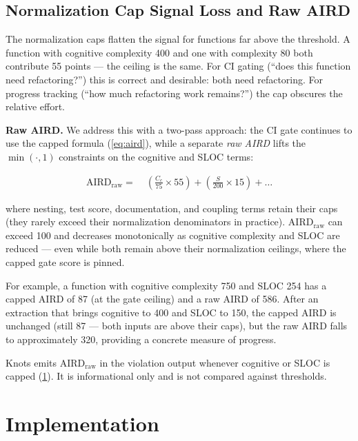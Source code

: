 \documentclass[10pt,twocolumn,letterpaper]{article}
\begin{document}
\subsection{Normalization Cap Signal Loss and Raw AIRD}
\label{sec:signal-loss}

The normalization caps flatten the signal for functions far above the
threshold.  A function with cognitive complexity 400 and one with
complexity 80 both contribute 55 points --- the ceiling is the same.
For CI gating (``does this function need refactoring?'') this is correct
and desirable: both need refactoring.  For progress tracking (``how much
refactoring work remains?'') the cap obscures the relative effort.

\textbf{Raw AIRD.}  We address this with a two-pass approach: the CI
gate continues to use the capped formula (\cref{eq:aird}), while a
separate \emph{raw AIRD} lifts the \(\min(\cdot, 1)\) constraints on the
cognitive and SLOC terms:

\begin{align}
\text{AIRD}_{\text{raw}} = &\;\left(\frac{C_c}{75} \times 55\right)
                           + \left(\frac{S}{200} \times 15\right)
                           + \ldots
\label{eq:aird-raw}
\end{align}

where nesting, test score, documentation, and coupling terms retain their
caps (they rarely exceed their normalization denominators in practice).
$\text{AIRD}_{\text{raw}}$ can exceed 100 and decreases monotonically as
cognitive complexity and SLOC are reduced --- even while both remain above
their normalization ceilings, where the capped gate score is pinned.

For example, a function with cognitive complexity 750 and SLOC 254 has a
capped AIRD of 87 (at the gate ceiling) and a raw AIRD of 586.  After an
extraction that brings cognitive to 400 and SLOC to 150, the capped AIRD
is unchanged (still 87 --- both inputs are above their caps), but the raw
AIRD falls to approximately 320, providing a concrete measure of progress.

Knots emits $\text{AIRD}_{\text{raw}}$ in the violation output whenever
cognitive or SLOC is capped (\cref{sec:implementation}).  It is
informational only and is not compared against thresholds.

\section{Implementation}
\label{sec:implementation}
\end{document}
